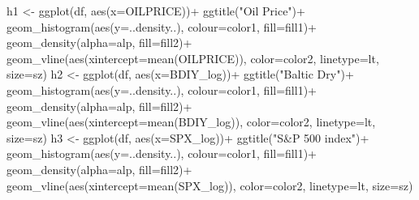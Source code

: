 \documentclass[
]{article}
\newenvironment{Shaded}{\begin{snugshade}}{\end{snugshade}}
\newcommand{\AttributeTok}[1]{\textcolor[rgb]{0.77,0.63,0.00}{#1}}
\newcommand{\FunctionTok}[1]{\textcolor[rgb]{0.00,0.00,0.00}{#1}}
\newcommand{\NormalTok}[1]{#1}
\newcommand{\OtherTok}[1]{\textcolor[rgb]{0.56,0.35,0.01}{#1}}
\newcommand{\SpecialCharTok}[1]{\textcolor[rgb]{0.00,0.00,0.00}{#1}}
\newcommand{\StringTok}[1]{\textcolor[rgb]{0.31,0.60,0.02}{#1}}
\begin{document}
\begin{Shaded}
\begin{Highlighting}[]
\NormalTok{h1 }\OtherTok{\textless{}{-}} \FunctionTok{ggplot}\NormalTok{(df, }\FunctionTok{aes}\NormalTok{(}\AttributeTok{x=}\NormalTok{OILPRICE))}\SpecialCharTok{+} \FunctionTok{ggtitle}\NormalTok{(}\StringTok{"Oil Price"}\NormalTok{)}\SpecialCharTok{+}
  \FunctionTok{geom\_histogram}\NormalTok{(}\FunctionTok{aes}\NormalTok{(}\AttributeTok{y=}\NormalTok{..density..), }\AttributeTok{colour=}\NormalTok{color1, }\AttributeTok{fill=}\NormalTok{fill1)}\SpecialCharTok{+}
  \FunctionTok{geom\_density}\NormalTok{(}\AttributeTok{alpha=}\NormalTok{alp, }\AttributeTok{fill=}\NormalTok{fill2)}\SpecialCharTok{+}
  \FunctionTok{geom\_vline}\NormalTok{(}\FunctionTok{aes}\NormalTok{(}\AttributeTok{xintercept=}\FunctionTok{mean}\NormalTok{(OILPRICE)), }\AttributeTok{color=}\NormalTok{color2, }\AttributeTok{linetype=}\NormalTok{lt, }\AttributeTok{size=}\NormalTok{sz)}
\NormalTok{h2 }\OtherTok{\textless{}{-}} \FunctionTok{ggplot}\NormalTok{(df, }\FunctionTok{aes}\NormalTok{(}\AttributeTok{x=}\NormalTok{BDIY\_log))}\SpecialCharTok{+} \FunctionTok{ggtitle}\NormalTok{(}\StringTok{"Baltic Dry"}\NormalTok{)}\SpecialCharTok{+}
  \FunctionTok{geom\_histogram}\NormalTok{(}\FunctionTok{aes}\NormalTok{(}\AttributeTok{y=}\NormalTok{..density..), }\AttributeTok{colour=}\NormalTok{color1, }\AttributeTok{fill=}\NormalTok{fill1)}\SpecialCharTok{+}
  \FunctionTok{geom\_density}\NormalTok{(}\AttributeTok{alpha=}\NormalTok{alp, }\AttributeTok{fill=}\NormalTok{fill2)}\SpecialCharTok{+}
  \FunctionTok{geom\_vline}\NormalTok{(}\FunctionTok{aes}\NormalTok{(}\AttributeTok{xintercept=}\FunctionTok{mean}\NormalTok{(BDIY\_log)), }\AttributeTok{color=}\NormalTok{color2, }\AttributeTok{linetype=}\NormalTok{lt, }\AttributeTok{size=}\NormalTok{sz)}
\NormalTok{h3 }\OtherTok{\textless{}{-}} \FunctionTok{ggplot}\NormalTok{(df, }\FunctionTok{aes}\NormalTok{(}\AttributeTok{x=}\NormalTok{SPX\_log))}\SpecialCharTok{+} \FunctionTok{ggtitle}\NormalTok{(}\StringTok{"S\&P 500 index"}\NormalTok{)}\SpecialCharTok{+}
  \FunctionTok{geom\_histogram}\NormalTok{(}\FunctionTok{aes}\NormalTok{(}\AttributeTok{y=}\NormalTok{..density..), }\AttributeTok{colour=}\NormalTok{color1, }\AttributeTok{fill=}\NormalTok{fill1)}\SpecialCharTok{+}
  \FunctionTok{geom\_density}\NormalTok{(}\AttributeTok{alpha=}\NormalTok{alp, }\AttributeTok{fill=}\NormalTok{fill2)}\SpecialCharTok{+}
  \FunctionTok{geom\_vline}\NormalTok{(}\FunctionTok{aes}\NormalTok{(}\AttributeTok{xintercept=}\FunctionTok{mean}\NormalTok{(SPX\_log)), }\AttributeTok{color=}\NormalTok{color2, }\AttributeTok{linetype=}\NormalTok{lt, }\AttributeTok{size=}\NormalTok{sz)}

\end{Highlighting}
\end{Shaded}
\end{document}
